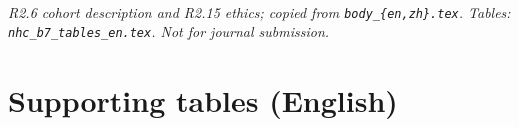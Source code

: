 \documentclass[11pt,a4paper]{ctexart}
\renewcommand{\SupportingLabel}{Supporting tables (English)}
\begin{document}
\\
\noindent\textit{R2.6 cohort description and R2.15 ethics; copied from \texttt{body\_\{en,zh\}.tex}. Tables: \texttt{nhc\_b7\_tables\_en.tex}. Not for journal submission.}\par
\vspace{1em}



\clearpage
\section*{\SupportingLabel}

\end{document}
